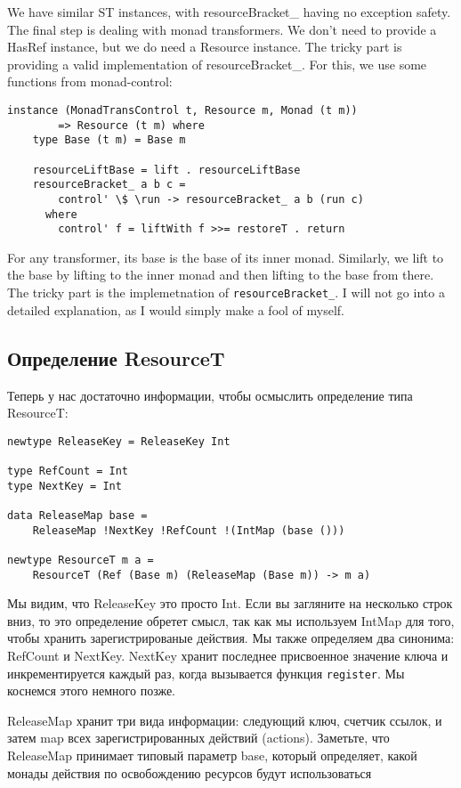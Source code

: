 We have similar ST instances, with resourceBracket\_ having no
exception safety. The final step is dealing with monad transformers. We don't need to
provide a
HasRef instance, but we do need a Resource instance. The
tricky part is providing a valid implementation of resourceBracket\_. For this,
we use some functions from monad-control:

\begin{lstlisting}
instance (MonadTransControl t, Resource m, Monad (t m))
        => Resource (t m) where
    type Base (t m) = Base m

    resourceLiftBase = lift . resourceLiftBase
    resourceBracket_ a b c =
        control' \$ \run -> resourceBracket_ a b (run c)
      where
        control' f = liftWith f >>= restoreT . return 
\end{lstlisting}
For any transformer, its base is the base of its inner monad. Similarly, we lift to the
base by
lifting to the inner monad and then lifting to the base from there. The tricky part is the
implemetnation of \verb=resourceBracket_=. I will not go into a detailed explanation,
as I would simply make a fool of myself.

\subsection{Определение ResourceT}

Теперь у нас достаточно информации, чтобы осмыслить определение типа ResourceT:
\begin{lstlisting}
newtype ReleaseKey = ReleaseKey Int

type RefCount = Int
type NextKey = Int

data ReleaseMap base =
    ReleaseMap !NextKey !RefCount !(IntMap (base ()))

newtype ResourceT m a =
    ResourceT (Ref (Base m) (ReleaseMap (Base m)) -> m a)
\end{lstlisting}
Мы видим, что ReleaseKey это просто Int. Если вы загляните на несколько строк вниз, то
это определение обретет смысл, так как мы используем IntMap для того, чтобы хранить
зарегистрированые действия. Мы также определяем два синонима: RefCount и NextKey. NextKey
хранит последнее присвоенное значение ключа и инкрементируется каждый раз, когда
вызывается функция \verb=register=. Мы коснемся этого немного позже.

ReleaseMap хранит три вида информации: следующий ключ, счетчик ссылок, и затем map всех
зарегистрированных действий (actions). Заметьте, что ReleaseMap принимает типовый
параметр base, который определяет, какой монады действия по освобождению ресурсов  будут
использоваться 

